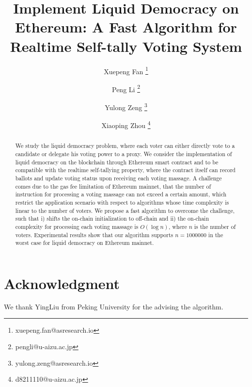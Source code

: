 \documentclass[12pt]{article}
\begin{document}
	\pagestyle{empty}

	\title{Implement Liquid Democracy on Ethereum: A Fast Algorithm for Realtime Self-tally Voting System}
\author[1]{Xuepeng Fan \thanks{xuepeng.fan@asresearch.io}}
\author[2]{Peng Li \thanks{pengli@u-aizu.ac.jp}}
\author[1]{Yulong Zeng \thanks{yulong.zeng@asresearch.io}}
\author[2]{Xiaoping Zhou \thanks{d8211110@u-aizu.ac.jp}}

\maketitle
\begin{abstract}
	We study the liquid democracy problem, where each voter can either directly vote to a candidate or delegate his voting power to a proxy. We consider the implementation of liquid democracy on the blockchain through Ethereum smart contract and to be compatible with the realtime self-tallying property, where the contract itself can record  ballots and update voting status upon receiving each voting massage.  A challenge comes due to the gas fee limitation of Ethereum mainnet, that the number of instruction for processing a voting massage can not exceed a certain amount, which restrict the application scenario with respect to algorithms whose time complexity is linear to the number of voters. We propose a fast algorithm to overcome the challenge, such that i) shifts the on-chain initialization to off-chain and ii) the on-chain complexity for processing each voting massage is $O(\log n)$, where $n$ is the number of voters. Experimental results show that our algorithm supports $n=1000000$ in the worst case for liquid democracy on Ethereum mainnet.
\end{abstract}







\section*{Acknowledgment}
We thank YingLiu from Peking University for the advising the algorithm.



\end{document}
